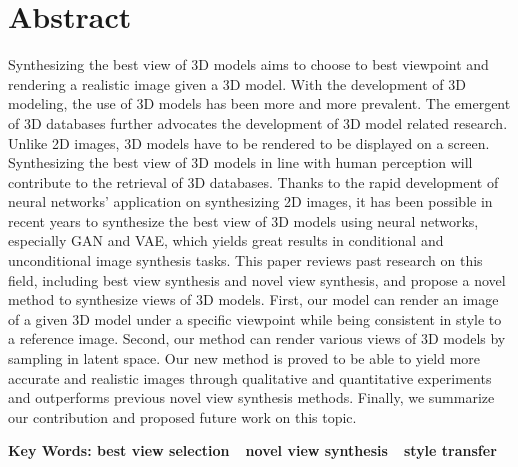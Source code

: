 \documentclass[UTF8,openany,AutoFakeBold,AutoFakeSlant,cs4size]{ctexbook}
\begin{document}
\fancyhf{}
\fancyfoot[CO,CE]{~\thepage~}
\renewcommand{\headrulewidth}{0.7pt}
\renewcommand{\footrulewidth}{0pt}
\clearpage






\small
\linespread{1.5}\selectfont
\chapter*{\bfseries Abstract}

Synthesizing the best view of 3D models aims to choose to best viewpoint and rendering a realistic image given a 3D model. With the development of 3D modeling, the use of 3D models has been more and more prevalent. The emergent of 3D databases further advocates the development of 3D model related research. Unlike 2D images, 3D models have to be rendered to be displayed on a screen. Synthesizing the best view of 3D models in line with human perception will contribute to the retrieval of 3D databases. Thanks to the rapid development of neural networks' application on synthesizing 2D images, it has been possible in recent years to synthesize the best view of 3D models using neural networks, especially GAN and VAE, which yields great results in conditional and unconditional image synthesis tasks. This paper reviews past research on this field, including best view synthesis and novel view synthesis, and propose a novel method to synthesize views of 3D models. First, our model can render an image of a given 3D model under a specific viewpoint while being consistent in style to a reference image. Second, our method can render various views of 3D models by sampling in latent space. Our new method is proved to be able to yield more accurate and realistic images through qualitative and quantitative experiments and outperforms previous novel view synthesis methods. Finally, we summarize our contribution and proposed future work on this topic.

\bigskip
\noindent
{\bfseries Key Words: best view selection\ \ novel view synthesis\ \ style transfer}



{
	\fancyhf{}
	\fancyfoot[CO,CE]{~\thepage~}
	\renewcommand{\headrulewidth}{0.7pt}
	\renewcommand{\footrulewidth}{0pt}
}
\fancyhf{}
\fancyfoot[CO,CE]{~\thepage~}
\renewcommand{\headrulewidth}{0.7pt}
\renewcommand{\footrulewidth}{0pt}
\clearpage
\end{document}

